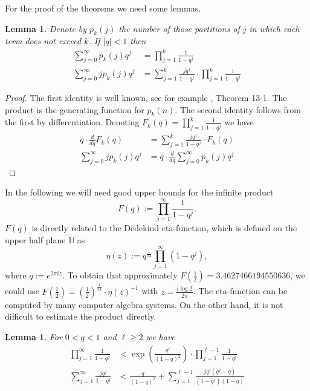 \documentclass[12pt]{amsart}
\newtheorem{lem}[thm]{Lemma}
\theoremstyle{definition}
\theoremstyle{remark}
\newcommand{\HH}{\mathbb{H}}
\newcommand{\abs}[1]{\lvert#1\rvert}
\begin{document}
For the proof of the theorems we need some lemmas.

\begin{lem}\label{gen}
Denote by $p_k(j)$ the number of those partitions of $j$ in which each term
does not exceed $k$. If $\abs q<1$ then
\begin{align}\label{pro}
\sum_{j=0}^{\infty}p_k(j)q^j & =\prod_{j=1}^k\frac{1}{1-q^j}\\
\sum_{j=0}^{\infty}jp_k(j)q^j & =\sum_{j=1}^k\frac{jq^j}{1-q^j}\cdot \prod_{j=1}^k\frac{1}{1-q^j}
\end{align}
\end{lem}

\begin{proof}
The first identity is well known, see for example \cite{AN}, Theorem 13-1.
The product is the generating function for $p_k(n)$.
The second identity follows from the first by differentiation. 
Denoting $F_k(q)=\prod_{j=1}^k\frac{1}{1-q^j}$ we have
\begin{align*}
q\cdot \frac{d}{dq}F_k(q) & =\sum_{j=1}^k\frac{jq^j}{1-q^j}\cdot F_k(q)\\
\sum_{j=0}^{\infty}jp_k(j)q^j & = q\cdot \frac{d}{dq}\sum_{j=0}^{\infty}p_k(j)q^j 
\end{align*}
\end{proof}

In the following we will need good upper bounds for the 
infinite product 
\begin{equation*}
F(q):=\prod_{j=1}^{\infty}\frac{1}{1-q^j}.
\end{equation*}
$F(q)$ is directly related to the Dedekind eta-function, which is
defined on the upper half plane $\HH$ as 
\begin{equation*}
\eta (z):=q^{\frac{1}{24}}\prod_{j=1}^{\infty}(1-q^j),
\end{equation*}
where $q:=e^{2\pi iz}$. To obtain that approximately
$F(\frac{1}{2})=3.4627466194550636$, we could use 
$F(\frac{1}{2})=(\frac{1}{2})^{\frac{1}{24}}\cdot\eta (z)^{-1}$
with $z=\frac{i\log 2}{2\pi}$. The eta-function can be computed by many computer algebra systems.
On the other hand, it is not difficult to estimate the product
directly.

\begin{lem}\label{rest}
For $0<q<1$ and $\ell \ge 2$ we have
\begin{align}\label{ab}
\prod_{j=1}^{\infty}\frac{1}{1-q^j} & <\exp{\left(\frac{q^{\ell}}{(1-q)^2}\right)}\cdot 
\prod_{j=1}^{\ell -1}\frac{1}{1-q^j}\\ 
\sum_{j=1}^{\infty}\frac{jq^j}{1-q^j} & <\frac{q}{(1-q)^3}+
\sum_{j=1}^{\ell -1}\frac{jq^j(q^j-q)}{(1-q^j)(1-q)}
\end{align}
\end{lem}               
\end{document}
